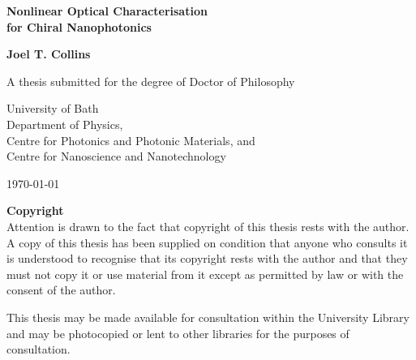 \begin{center}
    \vspace*{1cm}
    
    \LARGE
    \textbf{Nonlinear Optical Characterisation \\for Chiral Nanophotonics}
    
    \vspace{0.5cm}
    \large
    \textbf{Joel T. Collins}
    
    \vspace{1.5cm}
    \normalsize
    A thesis submitted for the degree of Doctor of Philosophy
    
    \vspace{0.8cm}
    University of Bath\\
    Department of Physics,\\
    Centre for Photonics and Photonic Materials, and\\
    Centre for Nanoscience and Nanotechnology
    
    \vspace{0.5cm}
    \today
    
    \vspace{1.5cm}

    \textbf{Copyright}\\
    Attention is drawn to the fact that copyright of this thesis rests with the author. A copy of this thesis has been supplied on condition that anyone who consults it is understood to recognise that its copyright rests with the author and that they must not copy it or use material from it except as permitted by law or with the consent of the author. 

    \vspace{1.5cm}

    This thesis may be made available for consultation within the University Library and may be photocopied or lent to other libraries for the purposes of consultation. 



\end{center}